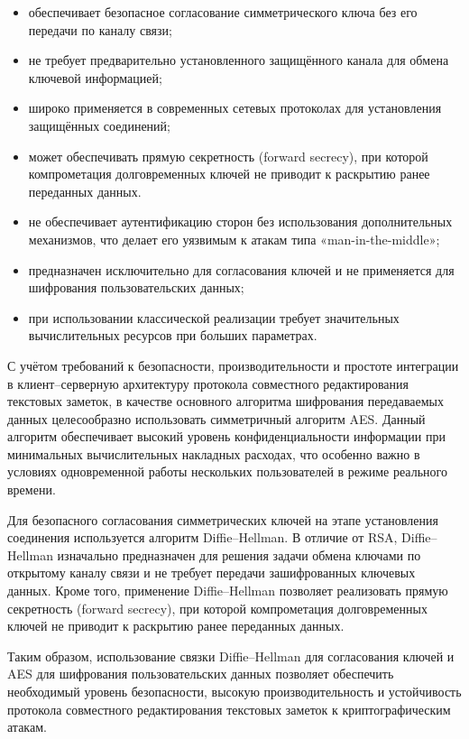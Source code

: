 \begin{itemize}
    \item обеспечивает безопасное согласование симметрического ключа без его передачи по каналу связи;
    \item не требует предварительно установленного защищённого канала для обмена ключевой информацией;
    \item широко применяется в современных сетевых протоколах для установления защищённых соединений;
    \item может обеспечивать прямую секретность (forward secrecy), при которой компрометация долговременных ключей не приводит к раскрытию ранее переданных данных.
\end{itemize}

\begin{itemize}
    \item не обеспечивает аутентификацию сторон без использования дополнительных механизмов, что делает его уязвимым к атакам типа «man-in-the-middle»;
    \item предназначен исключительно для согласования ключей и не применяется для шифрования пользовательских данных;
    \item при использовании классической реализации требует значительных вычислительных ресурсов при больших параметрах.
\end{itemize}

С учётом требований к безопасности, производительности и простоте интеграции в клиент--серверную архитектуру протокола совместного редактирования текстовых заметок, в качестве основного алгоритма шифрования передаваемых данных целесообразно использовать симметричный алгоритм AES. Данный алгоритм обеспечивает высокий уровень конфиденциальности информации при минимальных вычислительных накладных расходах, что особенно важно в условиях одновременной работы нескольких пользователей в режиме реального времени.

Для безопасного согласования симметрических ключей на этапе установления соединения используется алгоритм Diffie--Hellman. В отличие от RSA, Diffie--Hellman изначально предназначен для решения задачи обмена ключами по открытому каналу связи и не требует передачи зашифрованных ключевых данных. Кроме того, применение Diffie--Hellman позволяет реализовать прямую секретность (forward secrecy), при которой компрометация долговременных ключей не приводит к раскрытию ранее переданных данных.

Таким образом, использование связки Diffie--Hellman для согласования ключей и AES для шифрования пользовательских данных позволяет обеспечить необходимый уровень безопасности, высокую производительность и устойчивость протокола совместного редактирования текстовых заметок к криптографическим атакам.

